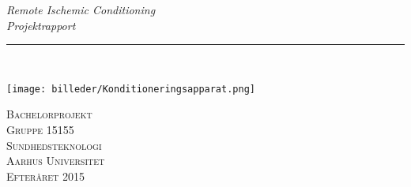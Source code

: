 \thispagestyle{empty}
\begin{flushright}
\vspace{3cm}

\phantom{hul}

\phantom{hul}

\phantom{hul}

\textsl{\Huge Remote Ischemic Conditioning} \\ \vspace{1cm}
\textsl{\Huge Projektrapport} \\ \vspace{1cm}

\rule{\textwidth}{3mm} \\ \vspace{1.5cm}
\vspace{1cm}

\texttt{[image: billeder/Konditioneringsapparat.png]}

\vspace{2cm} 
\textsc{\Large Bachelorprojekt \\
Gruppe 15155 \\
Sundhedsteknologi \\
Aarhus Universitet \\
Efteråret 2015 \\}
\end{flushright}
